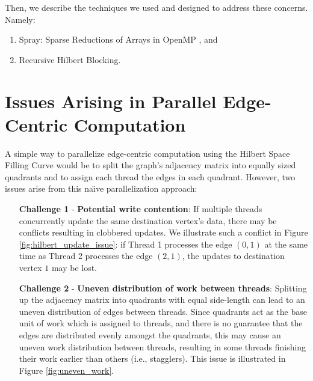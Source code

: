 Then, we describe the techniques we used and designed to address these concerns. Namely:
\begin{enumerate}
    \item Spray: Sparse Reductions of Arrays in OpenMP \cite{spray}, and
    \item Recursive Hilbert Blocking.

\end{enumerate}




\section{Issues Arising in Parallel Edge-Centric Computation}
A simple way to parallelize edge-centric computation using the Hilbert Space Filling Curve would be to split the graph's adjacency matrix into equally sized quadrants and to assign each thread the edges in each quadrant. However, two issues arise from this na\"{\i}ve  parallelization approach:


\begin{itemize}
    \item [\textbf{Challenge 1}] - \textbf{Potential write contention}:
          If multiple threads concurrently update the same destination vertex's data, there
          may be conflicts resulting in clobbered updates. We illustrate such a conflict in Figure \ref{fig:hilbert_update_issue}: if Thread 1 processes the edge $(0, 1)$ at the same time as Thread 2 processes the edge $(2, 1)$, the updates to destination vertex $1$ may be lost.
    \item [\textbf{Challenge 2}] - \textbf{Uneven distribution of work between threads}: Splitting up the
          adjacency matrix into quadrants with equal side-length can lead to an uneven
          distribution of edges between threads. Since quadrants act as the base unit of work which is assigned to threads, and there is no guarantee that the edges are distributed evenly amongst the quadrants, this may cause an uneven work distribution between threads, resulting in some threads finishing their work earlier than others (i.e., stagglers). This issue is illustrated in Figure
          \ref{fig:uneven_work}.
\end{itemize}

